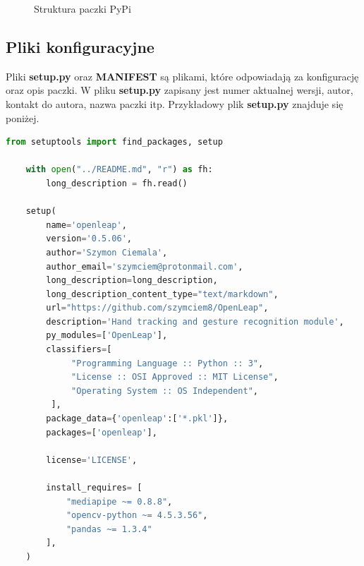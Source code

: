 \begin{figure}
\centering
    \begin{minipage}{7cm}
    \end{minipage}
    \caption{Struktura paczki PyPi}
    \label{tree:pypi_package}
\end{figure}

\subsection{Pliki konfiguracyjne}
\quad Pliki \textbf{setup.py} oraz \textbf{MANIFEST} są plikami, które odpowiadają za konfigurację oraz opis paczki. W pliku \textbf{setup.py} zapisany jest numer aktualnej wersji, autor, kontakt do autora, nazwa paczki itp. Przykładowy plik \textbf{setup.py} znajduje się poniżej. \newline

\begin{lstlisting}[language=python, style=programming, captionpos=b, caption={Sprawdzenie poprawności}]
    from setuptools import find_packages, setup

    with open("../README.md", "r") as fh:
        long_description = fh.read()
    
    setup(
        name='openleap', 
        version='0.5.06',
        author='Szymon Ciemala',
        author_email='szymciem@protonmail.com',
        long_description=long_description,
        long_description_content_type="text/markdown",
        url="https://github.com/szymciem8/OpenLeap",
        description='Hand tracking and gesture recognition module', 
        py_modules=['OpenLeap'], 
        classifiers=[
             "Programming Language :: Python :: 3",
             "License :: OSI Approved :: MIT License",
             "Operating System :: OS Independent",
         ],
        package_data={'openleap':['*.pkl']},
        packages=['openleap'],
    
        license='LICENSE',
    
        install_requires= [
            "mediapipe ~= 0.8.8",
            "opencv-python ~= 4.5.3.56", 
            "pandas ~= 1.3.4"
        ],    
    )
\end{lstlisting}


